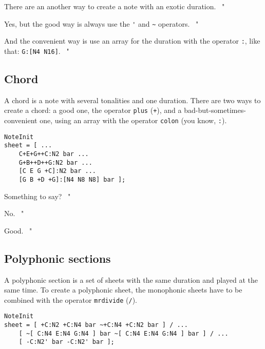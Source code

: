 \documentclass{article}
\newenvironment{meenv}{ \par \noindent \makebox[6em][r]{ \textcolor{mecolor}{Me}: " --~}}{~"}
\newenvironment{myselfenv}{ \par \noindent \makebox[6em][r]{ \textcolor{myselfcolor}{Myself}: " --~}}{~"}
\newcommand{ \me }[1]{%
\begin{meenv}%
	#1%
\end{meenv} }
\newcommand{ \myself }[1]{%
\begin{myselfenv}%
	#1%
\end{myselfenv} }
\begin{document}
\me{There are an another way to create a note with an exotic duration.}
\begin{myselfenv}
	Yes, but the good way is always use the \lstinline!'! and \lstinline!~! operators.
\end{myselfenv}
\begin{meenv}
	And the convenient way is use an array for the duration with the operator \lstinline!:!, like that: \lstinline!G:[N4 N16]!.
\end{meenv}

\subsection{Chord}

A chord is a note with several tonalities and one duration. There are two ways to create a chord: a good one, the operator \lstinline!plus! (\lstinline!+!), and a bad-but-sometimes-convenient one, using an array with the operator \lstinline!colon! (you know, \lstinline!:!). \\

\begin{lstlisting}
NoteInit
sheet = [ ...
	C+E+G++C:N2 bar ...
	G+B++D++G:N2 bar ...
	[C E G +C]:N2 bar ...
	[G B +D +G]:[N4 N8 N8] bar ];
\end{lstlisting}

\myself{Something to say?}
\me{No.}
\myself{Good.}

\subsection{Polyphonic sections}

A polyphonic section is a set of sheets with the same duration and played at the same time. To create a polyphonic sheet, the monophonic sheets have to be combined with the operator \lstinline!mrdivide! (\lstinline!/!). \\
\begin{lstlisting}
NoteInit
sheet = [ +C:N2 +C:N4 bar ~+C:N4 +C:N2 bar ] / ...
	[ ~[ C:N4 E:N4 G:N4 ] bar ~[ C:N4 E:N4 G:N4 ] bar ] / ...
	[ -C:N2' bar -C:N2' bar ];
\end{lstlisting}
\end{document}
